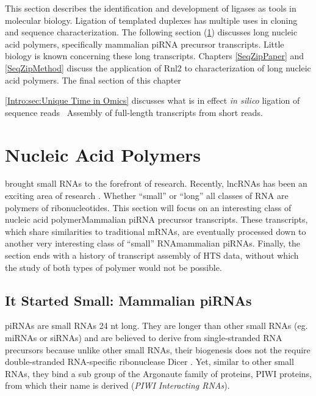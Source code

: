     This section describes the identification and development of ligases as tools in molecular biology. Ligation of templated duplexes has multiple uses in cloning and sequence characterization. The following section (\ref{Intro:sec:Nucleic Acid Polymers}) discusses long nucleic acid polymers, specifically mammalian piRNA precursor transcripts. Little biology is known concerning these long transcripts. Chapters \ref{SeqZipPaper} and \ref{SeqZipMethod} discuss the application of Rnl2 to characterization of long nucleic acid polymers. The final section of this chapter {\ref{Intro:sec:Unique Time in Omics} discusses what is in effect \textit{in silico} ligation of sequence reads\textendash~ Assembly of full-length transcripts from short reads.

\section{Nucleic Acid Polymers}
  \label{Intro:sec:Nucleic Acid Polymers}

  \citet{Fire1998} brought small RNAs to the forefront of research. Recently, lncRNAs has been an exciting area of research \citep{Khalil2009,Guttman2009}. Whether ``small'' or ``long'' all classes of RNA are polymers of ribonucleotides. This section will focus on an interesting class of nucleic acid polymer\textenddash Mammalian piRNA precursor transcripts. These transcripts, which share similarities to traditional mRNAs, are eventually processed down to another very interesting class of ``small'' RNA\textendash mammalian piRNAs. Finally, the section ends with a history of transcript assembly of HTS data, without which the study of both types of polymer would not be possible.

  \subsection{It Started Small: Mammalian piRNAs}
  
    piRNAs are small RNAs 24 nt long. They are longer than other small RNAs (eg. miRNAs or siRNAs) and are believed to derive from single-stranded RNA precursors because unlike other small RNAs, their biogenesis does not the require double-stranded RNA-specific ribonuclease Dicer \citep{Vagin2006, Houwing2007}. Yet, similar to other small RNAs, they bind a sub group of the Argonaute family of proteins, PIWI proteins, from which their name is derived (\textit{PIWI Interacting RNAs}). 

}
